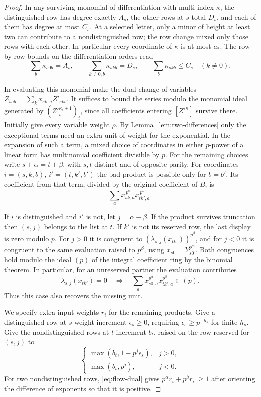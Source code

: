\begin{proof}
In any surviving monomial of differentiation with
multi-index \(\kappa\), the distinguished row has degree exactly
\(A_s\), the other rows at \(s\) total \(D_s\), and each of them
has degree at most \(C_s\). At a selected letter, only a minor
of height at least two can contribute to a nondistinguished row;
the row change mixed only those rows with each other. In
particular every coordinate of \(\kappa\) is at most \(a_*\).
The row-by-row bounds on the differentiation orders read
\[
  \sum_b\kappa_{s0b}=A_s,\qquad \sum_{k\ne0,b}\kappa_{skb}=D_s,\qquad \sum_b\kappa_{skb}\le C_s\quad(k\ne0).
\]

In evaluating this monomial make the dual change of variables
\(Z_{sab}=\sum_k x_{sk,a}Z'_{skb}\). It suffices to bound
the series modulo the monomial ideal generated by
\(({Z'}_i^{\kappa_i+1})_i\), since all coefficients entering
\([{Z'}^\kappa]\) survive there. Initially give every variable
weight \(\rho\). By Lemma~\ref{lem:two-differences} only the
exceptional terms need an extra unit of weight for the
exponential. In the expansion of such a term, a mixed choice of
coordinates in either \(p\)-power of a linear form has
multinomial coefficient divisible by \(p\). For the remaining
choices write \(s+\alpha=t+\beta\), with \(s,t\) distinct and of
opposite parity. For coordinates \(i=(s,k,b)\), \(i'=(t,k',b')\)
the bad product is possible only for \(b=b'\). Its coefficient
from that term, divided by the original coefficient of \(B\),
is
\[
                \sum_a x_{sk,a}^{\,p^\alpha}
                           x_{tk',a}^{\,p^\beta}.
\]

If \(i\) is distinguished and \(i'\) is not, let
\(j=\alpha-\beta\). If the product survives truncation then
\((s,j)\) belongs to the list at \(t\). If \(k'\) is not its
reserved row, the last display is zero modulo \(p\). For \(j>0\)
it is congruent to
\((\lambda_{s,j}(x_{tk'}))^{p^\beta}\), and for \(j<0\) it is
congruent to the same evaluation raised to \(p^\beta\), using
\(x_{s0}=Y_{s0}^{p^m}\). Both congruences hold modulo the ideal
\((p)\) of the integral coefficient ring by the binomial
theorem.
In particular, for an unreserved partner the evaluation contributes
\[
  \lambda_{s,j}(x_{tk'})=0\quad\Longrightarrow\quad \sum_a x_{s0,a}^{p^\alpha}x_{tk',a}^{p^\beta}\in(p).
\]
 Thus this case also recovers the missing unit.

We specify extra input weights \(r_i\) for the remaining
products. Give a distinguished row at \(s\) weight increment
\(\epsilon_s\ge0\), requiring \(\epsilon_s\ge p^{-h_s}\) for
finite \(h_s\). Give the nondistinguished rows at \(t\) increment
\(b_t\), raised on the row reserved for \((s,j)\) to
\[
 \begin{cases}
 \max(b_t,1-p^j\epsilon_s),&j>0,\\
 \max(b_t,p^j),&j<0 .
 \end{cases}
\]
For two nondistinguished rows, \eqref{eq:flow-dual} gives
\(p^\alpha r_i+p^\beta r_{i'}\ge1\) after orienting the difference
of exponents so that it is positive.


\end{proof}
